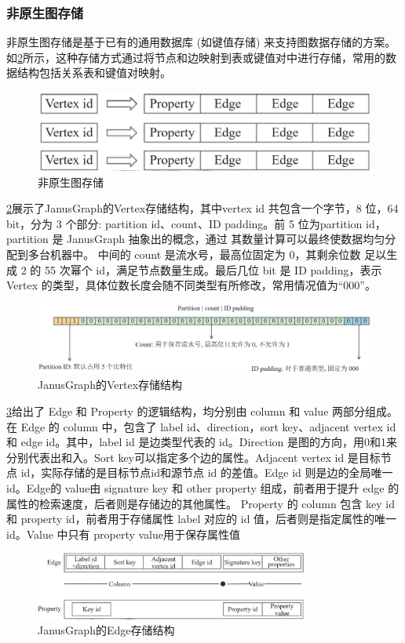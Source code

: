 \subsubsection{非原生图存储}

非原生图存储是基于已有的通用数据库  (如键值存储)  来支持图数据存储的方案。如\cref{fig:janusgraph-vertex}所示，这种存储方式通过将节点和边映射到表或键值对中进行存储，常用的数据结构包括关系表和键值对映射。\begin{figure}[H]
	\centering
	\includegraphics[width=\textwidth]{images/6.png}
	\caption{非原生图存储}
	\label{fig:non-native}
\end{figure}
\cref{fig:janusgraph-vertex}展示了JanusGraph的Vertex存储结构，其中vertex id 共包含一个字节，8 位，64 bit，分为  3 个部分: partition id、count、ID padding。前 5 位为partition id，partition 是 JanusGraph 抽象出的概念，通过  其数量计算可以最终使数据均匀分配到多台机器中。 中间的 count 是流水号，最高位固定为 0，其剩余位数  足以生成 2 的 55 次幂个 id，满足节点数量生成。最后几位 bit 是 ID padding，表示 Vertex 的类型，具体位数长度会随不同类型有所修改，常用情况值为“000”。\begin{figure}[H]
	\includegraphics[width=1\textwidth]{images/12.png}
	\caption{JanusGraph的Vertex存储结构}
	\label{fig:janusgraph-vertex}
\end{figure}
\cref{fig:janusgraph-edge}给出了 Edge 和 Property 的逻辑结构，均分别由 column 和 value 两部分组成。在 Edge 的 column 中，包含了 label id、direction，sort key、adjacent vertex id 和 edge id。其中，label id 是边类型代表的 id。Direction 是图的方向，用0和1来分别代表出和入。Sort key可以指定多个边的属性。Adjacent vertex id 是目标节点 id，实际存储的是目标节点id和源节点 id 的差值。Edge id 则是边的全局唯一 id。Edge的 value由 signature key 和 other property 组成，前者用于提升 edge 的属性的检索速度，后者则是存储边的其他属性。 Property 的 column 包含 key id 和 property id，前者用于存储属性 label 对应的 id 值，后者则是指定属性的唯一 id。Value 中只有 property value用于保存属性值
\begin{figure}[H]
	\centering
	\includegraphics[width=0.8\textwidth]{images/13.png}
	\caption{JanusGraph的Edge存储结构}
	\label{fig:janusgraph-edge}
\end{figure}

